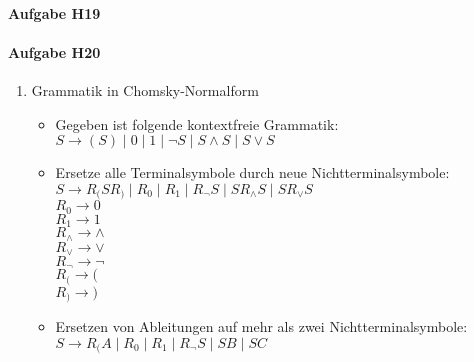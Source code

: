 \documentclass[11pt]{article}
\begin{document}

\paragraph{Aufgabe H19}


\paragraph{Aufgabe H20}
\begin{enumerate}
\item Grammatik in Chomsky-Normalform
\begin{itemize}
\item  Gegeben ist folgende kontextfreie Grammatik:
\\\hspace*{6mm}$S \rightarrow (S)\mid 0 \mid 1\mid \neg S \mid S \wedge S \mid S \vee S$
\item Ersetze alle Terminalsymbole durch neue Nichtterminalsymbole:
\\\hspace*{6mm} $S \rightarrow R_{(}SR_{)}\mid R_{0} \mid R_{1}\mid R_{\neg} S \mid S R_{\wedge} S \mid S R_{\vee} S$
\\\hspace*{6mm} $R_{0} \rightarrow 0$
\\\hspace*{6mm} $R_{1} \rightarrow 1$
\\\hspace*{6mm} $R_{\wedge} \rightarrow \wedge$
\\\hspace*{6mm} $R_{\vee} \rightarrow \vee$
\\\hspace*{6mm} $R_{\neg} \rightarrow \neg$
\\\hspace*{6mm} $R_{(} \rightarrow ($
\\\hspace*{6mm} $R_{)} \rightarrow )$
\item Ersetzen von Ableitungen auf mehr als zwei Nichtterminalsymbole:
\\\hspace*{6mm} $S \rightarrow R_{(}A\mid R_{0} \mid R_{1}\mid R_{\neg} S \mid S B \mid S C$

\end{itemize}
\end{enumerate}
\end{document}
